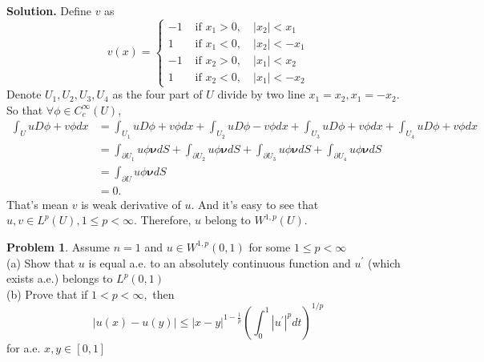 \documentclass[a4paper]{book}
\newenvironment{solution}%
{\noindent\textbf{Solution.}}%
{\qedhere}
\numberwithin{equation}{chapter}
\theoremstyle{definition}
\newtheorem{pro}[exm]{Problem}
\begin{document}
\begin{solution}
  Define $v$ as
  \[v(x)=\left\{
      \begin{array}{ll}
        -1 & \text { if } x_{1}>0, \quad\left|x_{2}\right|<x_{1} \\
        1 & \text { if } x_{1}<0, \quad\left|x_{2}\right|<-x_{1} \\
        -1 & \text { if } x_{2}>0, \quad\left|x_{1}\right|<x_{2} \\
        1 & \text { if } x_{2}<0, \quad\left|x_{1}\right|<-x_{2}
      \end{array}\right.\]
  Denote $U_1,U_2,U_3,U_4$ as the four part of $U$ divide by two line $x_1 = x_2,x_1 = -x_2$.
  So that $\forall \phi \in C^\infty_c(U)$, 
  \begin{align*}
    \int_U u D \phi + v \phi dx &=  \int_{U_1} u D \phi + v \phi dx  +  \int_{U_2} u D \phi - v \phi dx  +  \int_{U_3} u D \phi + v \phi dx  +  \int_{U_4} u D \phi + v \phi dx  \\
                                &=   \int_{\partial U_1} u \phi \boldsymbol{\nu} dS  +  \int_{\partial U_2} u \phi \bm{\nu}  dS  +  \int_{\partial U_3} u \phi \bm{\nu} dS  +  \int_{\partial U_4} u \phi \boldsymbol{\nu} dS \\
                                &= \int_{\partial U} u \phi \bm{\nu} dS \\
    &= 0.
  \end{align*}
    That's mean $v$ is weak derivative of $u$. And it's easy to see that $u,v \in L^p(U), 1 \leq p < \infty$. Therefore, $u$ belong to $W^{1,p}(U)$.
\end{solution}
\begin{pro}
  Assume $n=1$ and $u \in W^{1, p}(0,1)$ for some $1 \leq p<\infty$\\
  (a) Show that $u$ is equal a.e. to an absolutely continuous function and $u^{\prime}$ (which exists a.e.) belongs to $L^{p}(0,1)$\\
  (b) Prove that if $1<p<\infty,$ then
  \[
    |u(x)-u(y)| \leq|x-y|^{1-\frac{1}{p}}\left(\int_{0}^{1}\left|u^{\prime}\right|^{p} d t\right)^{1 / p}
  \]
  for a.e. $x, y \in[0,1]$
\end{pro}
\end{document}
